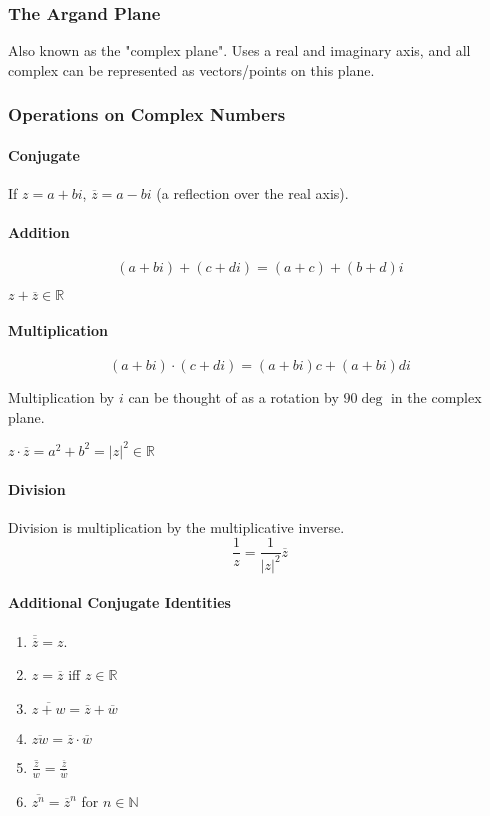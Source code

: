 \documentclass{article}
\begin{document}
\subsubsection{The Argand Plane} Also known as the "complex plane". Uses a real and imaginary axis, and all complex can be represented as vectors/points on this plane.

\subsubsection{Operations on Complex Numbers}
\paragraph{Conjugate}
If $z=a+bi$, $\overline{z}=a-bi$ (a reflection over the real axis).

\paragraph{Addition}
$$(a+bi) + (c+di) = (a+c) + (b+d)i$$

$z+\overline{z} \in \mathbb{R}$

\paragraph{Multiplication}
$$(a+bi) \cdot (c+di) = (a+bi)c + (a+bi)di$$

Multiplication by $i$ can be thought of as a rotation by $90\deg$ in the complex plane.

$z\cdot\overline{z} = a^2 + b^2 = |z|^2 \in \mathbb{R}$

\paragraph{Division}
Division is multiplication by the multiplicative inverse.
$$\frac{1}{z} = \frac{1}{|z|^2}\overline{z}$$

\paragraph{Additional Conjugate Identities}
\begin{enumerate}
    \item $\overline{\overline{z}} = z$.
    \item $z = \overline{z}$ iff $z\in\mathbb{R}$
    \item $\overline{z+w} = \overline{z} + \overline{w}$
    \item $\overline{zw} = \overline{z} \cdot \overline{w}$
    \item $\overline{\frac{z}{w}} = \frac{\overline{z}}{\overline{w}}$
    \item $\overline{z^n} = \overline{z}^n$ for $n \in\mathbb{N}$
\end{enumerate}
\end{document}
